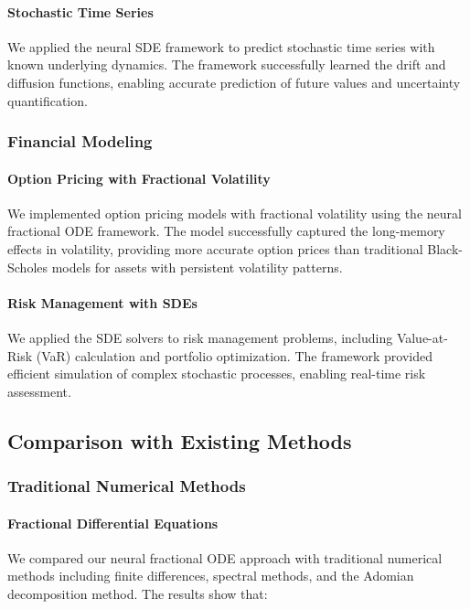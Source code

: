\paragraph{Stochastic Time Series}
We applied the neural SDE framework to predict stochastic time series with known underlying dynamics. The framework successfully learned the drift and diffusion functions, enabling accurate prediction of future values and uncertainty quantification.

\subsubsection{Financial Modeling}

\paragraph{Option Pricing with Fractional Volatility}
We implemented option pricing models with fractional volatility using the neural fractional ODE framework. The model successfully captured the long-memory effects in volatility, providing more accurate option prices than traditional Black-Scholes models for assets with persistent volatility patterns.

\paragraph{Risk Management with SDEs}
We applied the SDE solvers to risk management problems, including Value-at-Risk (VaR) calculation and portfolio optimization. The framework provided efficient simulation of complex stochastic processes, enabling real-time risk assessment.

\subsection{Comparison with Existing Methods}

\subsubsection{Traditional Numerical Methods}

\paragraph{Fractional Differential Equations}
We compared our neural fractional ODE approach with traditional numerical methods including finite differences, spectral methods, and the Adomian decomposition method. The results show that:

